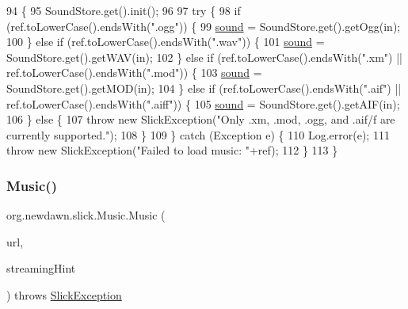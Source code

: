\begin{DoxyCode}
94                                                                    \{
95         SoundStore.get().init();
96         
97         \textcolor{keywordflow}{try} \{
98             \textcolor{keywordflow}{if} (ref.toLowerCase().endsWith(\textcolor{stringliteral}{".ogg"})) \{
99                 \mbox{\hyperlink{classorg_1_1newdawn_1_1slick_1_1_music_a17daed326f24bf361ff8677c33f06b2f}{sound}} = SoundStore.get().getOgg(in);
100             \} \textcolor{keywordflow}{else} \textcolor{keywordflow}{if} (ref.toLowerCase().endsWith(\textcolor{stringliteral}{".wav"})) \{
101                 \mbox{\hyperlink{classorg_1_1newdawn_1_1slick_1_1_music_a17daed326f24bf361ff8677c33f06b2f}{sound}} = SoundStore.get().getWAV(in);
102             \} \textcolor{keywordflow}{else} \textcolor{keywordflow}{if} (ref.toLowerCase().endsWith(\textcolor{stringliteral}{".xm"}) || ref.toLowerCase().endsWith(\textcolor{stringliteral}{".mod"})) \{
103                 \mbox{\hyperlink{classorg_1_1newdawn_1_1slick_1_1_music_a17daed326f24bf361ff8677c33f06b2f}{sound}} = SoundStore.get().getMOD(in);
104             \} \textcolor{keywordflow}{else} \textcolor{keywordflow}{if} (ref.toLowerCase().endsWith(\textcolor{stringliteral}{".aif"}) || ref.toLowerCase().endsWith(\textcolor{stringliteral}{".aiff"})) \{
105                 \mbox{\hyperlink{classorg_1_1newdawn_1_1slick_1_1_music_a17daed326f24bf361ff8677c33f06b2f}{sound}} = SoundStore.get().getAIF(in);
106             \} \textcolor{keywordflow}{else} \{
107                 \textcolor{keywordflow}{throw} \textcolor{keyword}{new} SlickException(\textcolor{stringliteral}{"Only .xm, .mod, .ogg, and .aif/f are currently supported."});
108             \}
109         \} \textcolor{keywordflow}{catch} (Exception e) \{
110             Log.error(e);
111             \textcolor{keywordflow}{throw} \textcolor{keyword}{new} SlickException(\textcolor{stringliteral}{"Failed to load music: "}+ref);
112         \}
113     \}
\end{DoxyCode}
\mbox{\label{classorg_1_1newdawn_1_1slick_1_1_music_acc662b7dce73c0103286797e1446fe46}} 
\subsubsection{\texorpdfstring{Music()}{Music()}\hspace{0.1cm}{\footnotesize\ttfamily [4/5]}}
{\footnotesize\ttfamily org.\+newdawn.\+slick.\+Music.\+Music (\begin{DoxyParamCaption}\item[{U\+RL}]{url,  }\item[{boolean}]{streaming\+Hint }\end{DoxyParamCaption}) throws \mbox{\hyperlink{classorg_1_1newdawn_1_1slick_1_1_slick_exception}{Slick\+Exception}}\hspace{0.3cm}{\ttfamily [inline]}}

